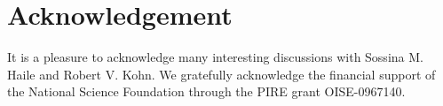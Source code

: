 \documentclass[11pt]{article}
\begin{document}
%
%


\section*{Acknowledgement}
It is a pleasure to acknowledge many interesting discussions with Sossina M. Haile and Robert V. Kohn. We gratefully acknowledge the financial support of the National Science Foundation through the PIRE grant  OISE-0967140.


{}

\end{document}
